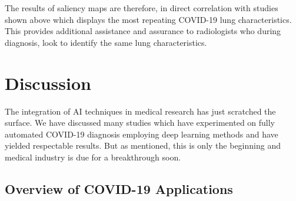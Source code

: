\vspace{-2em}



The results of saliency maps are therefore, in direct 
correlation with studies shown above which displays 
the most repeating COVID-19 lung characteristics. This provides 
additional assistance and assurance to radiologists who during 
diagnosis, look to identify the same lung characteristics.

\section{Discussion}
The integration of AI techniques in medical research has 
just scratched the surface. We have discussed many studies 
which have experimented on fully automated COVID-19 
diagnosis employing deep learning methods and have 
yielded respectable results. But as mentioned, this is 
only the beginning and medical industry is due for a 
breakthrough soon. 

\subsection{Overview of COVID-19 Applications}


